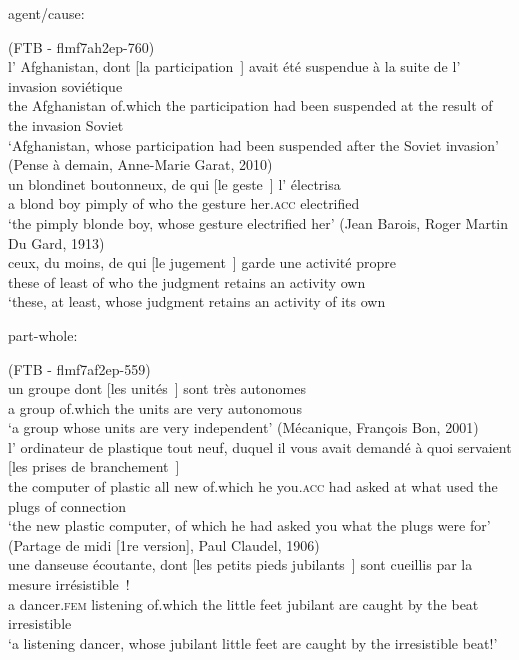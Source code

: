 \begin{exe} \label{ex:agens-cause}
\ex agent/cause:
\begin{xlist}
\ex (FTB - flmf7ah2ep-760)\\
\gll l' Afghanistan, dont [la participation~\trace{}] avait été suspendue à la suite de l' invasion soviétique\\
the Afghanistan of.which the participation had been suspended at the result of the invasion Soviet\\
\glt `Afghanistan, whose participation had been suspended after the Soviet invasion'
\ex (Pense à demain, Anne-Marie Garat, 2010)\\
\gll un blondinet boutonneux, de qui [le geste~\trace{}] l' électrisa\\
a {blond boy} pimply of who the gesture her.\textsc{acc} electrified\\
\glt `the pimply blonde boy, whose gesture electrified her'
\ex (Jean Barois, Roger Martin Du Gard, 1913)\\
\gll ceux, du moins, de qui [le jugement~\trace{}] garde une activité propre\\
these of least of who the judgment retains an activity own\\
\glt `these, at least, whose judgment retains an activity of its own
\end{xlist}

\ex part-whole: \label{ex:part-of-whole}
\begin{xlist}
\ex (FTB - flmf7af2ep-559)\\
\gll un groupe dont [les unités~\trace{}] sont très autonomes\\
a group of.which the units are very autonomous\\
\glt `a group whose units are very independent'
\ex (Mécanique, François Bon, 2001)\\
\gll l' ordinateur de plastique tout neuf, duquel il vous avait demandé à quoi servaient [les prises de branchement~\trace{}]\\
the computer of plastic all new of.which he you\textsc{.acc} had asked at what used the plugs of connection\\
\glt `the new plastic computer, of which he had asked you what the plugs  were for'
\ex (Partage de midi [1re version], Paul Claudel, 1906)\\
\gll une danseuse écoutante, dont [les petits pieds jubilants~\trace{}] sont cueillis par la mesure irrésistible~! \\
a dancer.\textsc{fem} listening of.which the little feet jubilant are caught by the beat irresistible\\
\glt `a listening dancer, whose jubilant little feet are caught by the irresistible beat!'
\end{xlist}


\end{exe}
